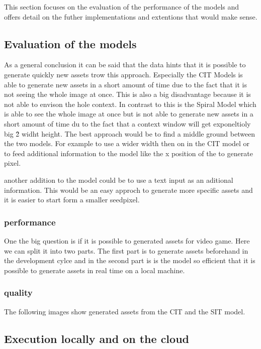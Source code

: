 
This section focuses on the evaluation of the performance of the models and offers detail on the futher implementations and extentions that would make sense.

\subsection{Evaluation of the models}
    
    As a general conclusion it can be said that the data hints that it is possible to generate quickly new assets trow this approach. Especially the CIT Models is able to generate new assets in a short amount of time due to the fact that it is not seeing the whole image at once. This is also a big disadvantage because it is not able to envison the hole context. In contrast to this is the Spiral Model which is able to see the whole image at once but is not able to generate new assets in a short amount of time du to the fact that a context window will get exponeltioly big \^ 2 widht \* height. The best approach would be to find a middle ground between the two models. For example to use a wider width then on in the CIT model or to feed additional information to the model like the x position of the to generate pixel.

    another addition to the model could be to use a text input as an aditional information. This would be an easy approch to generate more specific assets and it is easier to start form a smaller seedpixel.

    \subsubsection{performance}
    One the big question is if it is possible to generated assets for video game. Here we can split it into two parts. The first part is to generate assets beforehand in the development cylce and in the second part is is the model so efficient that it is possible to generate assets in real time on a local machine.

    \subsubsection{quality}
    The following images show generated assets from the CIT and the SIT model. 


\subsection{Execution locally and on the cloud}
    

